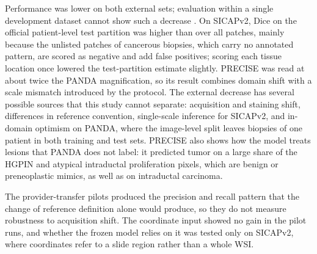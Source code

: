 \documentclass[10pt,letterpaper]{article}
\begin{document}
Performance was lower on both external sets; evaluation within a single development dataset cannot show such a decrease \cite{bib27,bib28,bib47}. On SICAPv2, Dice on the official patient-level test partition was higher than over all patches, mainly because the unlisted patches of cancerous biopsies, which carry no annotated pattern, are scored as negative and add false positives; scoring each tissue location once lowered the test-partition estimate slightly. PRECISE was read at about twice the PANDA magnification, so its result combines domain shift with a scale mismatch introduced by the protocol. The external decrease has several possible sources that this study cannot separate: acquisition and staining shift, differences in reference convention, single-scale inference for SICAPv2, and in-domain optimism on PANDA, where the image-level split leaves biopsies of one patient in both training and test sets. PRECISE also shows how the model treats lesions that PANDA does not label: it predicted tumor on a large share of the HGPIN and atypical intraductal proliferation pixels, which are benign or preneoplastic mimics, as well as on intraductal carcinoma.

The provider-transfer pilots produced the precision and recall pattern that the change of reference definition alone would produce, so they do not measure robustness to acquisition shift. The coordinate input showed no gain in the pilot runs, and whether the frozen model relies on it was tested only on SICAPv2, where coordinates refer to a slide region rather than a whole WSI.
\end{document}
